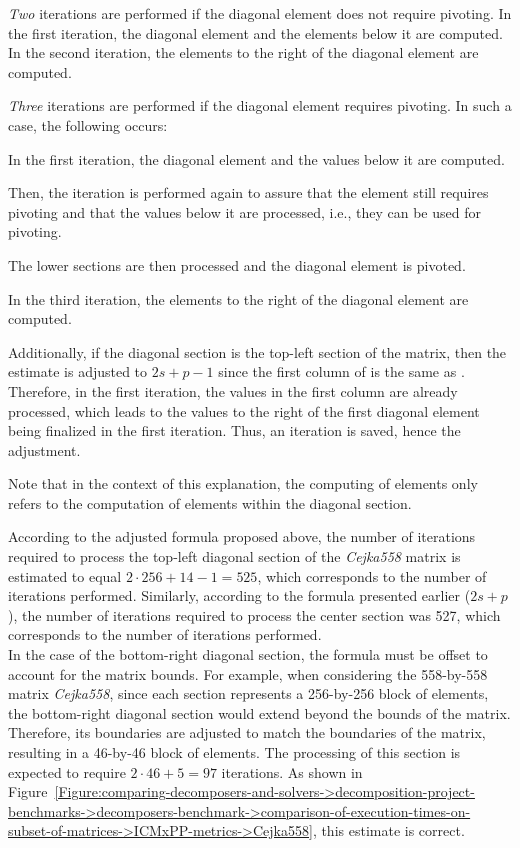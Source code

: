 \begin{tight_itemize}
	\item \textit{Two} iterations are performed if the diagonal element does not require pivoting.
In the first iteration, the diagonal element and the elements below it are computed.
In the second iteration, the elements to the right of the diagonal element are computed.
	\item \textit{Three} iterations are performed if the diagonal element requires pivoting.
In such a case, the following occurs:
	\begin{tight_enumerate}
		\item In the first iteration, the diagonal element and the values below it are computed.
		\item Then, the iteration is performed again to assure that the element still requires pivoting and that the values below it are processed, i.e., they can be used for pivoting.
		\item The lower sections are then processed and the diagonal element is pivoted.
		\item In the third iteration, the elements to the right of the diagonal element are computed.
	\end{tight_enumerate}
\end{tight_itemize}

Additionally, if the diagonal section is the top-left section of the matrix, then the estimate is adjusted to $2s + p - 1$ since the first column of  is the same as .
Therefore, in the first iteration, the values in the first column are already processed, which leads to the values to the right of the first diagonal element being finalized in the first iteration.
Thus, an iteration is saved, hence the adjustment.

Note that in the context of this explanation, the computing of elements only refers to the computation of elements within the diagonal section.

According to the adjusted formula proposed above, the number of iterations required to process the top-left diagonal section of the \textit{Cejka558} matrix is estimated to equal $2\cdot 256 + 14 - 1 = 525$, which corresponds to the number of iterations performed.
Similarly, according to the formula presented earlier ($2s + p$), the number of iterations required to process the center section was 527, which corresponds to the number of iterations performed.\\
In the case of the bottom-right diagonal section, the formula must be offset to account for the matrix bounds.
For example, when considering the 558-by-558 matrix \textit{Cejka558}, since each section represents a 256-by-256 block of elements, the bottom-right diagonal section would extend beyond the bounds of the matrix.
Therefore, its boundaries are adjusted to match the boundaries of the matrix, resulting in a 46-by-46 block of elements.
The processing of this section is expected to require $2\cdot 46 + 5 = 97$ iterations.
As shown in Figure~\ref{Figure:comparing-decomposers-and-solvers->decomposition-project-benchmarks->decomposers-benchmark->comparison-of-execution-times-on-subset-of-matrices->ICMxPP-metrics->Cejka558}, this estimate is correct.

